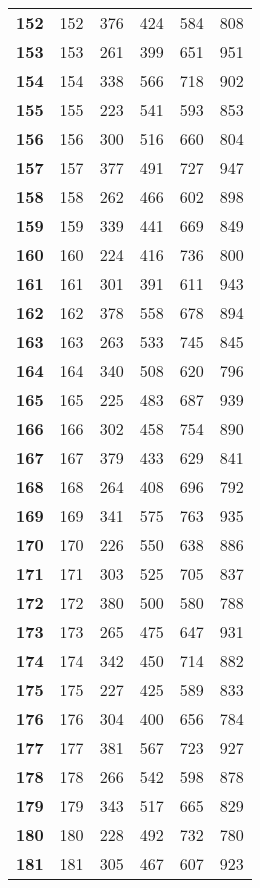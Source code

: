 \begin{longtable}{|l|c|c|c|c|c|}
  \textbf{152} & 152 &376 & 424 & 584 & 808 \\
  \textbf{153} & 153 &261 & 399 & 651 & 951 \\
  \textbf{154} & 154 &338 & 566 & 718 & 902 \\
  \textbf{155} & 155 &223 & 541 & 593 & 853 \\
  \textbf{156} & 156 &300 & 516 & 660 & 804 \\
  \textbf{157} & 157 &377 & 491 & 727 & 947 \\
  \textbf{158} & 158 &262 & 466 & 602 & 898 \\
  \textbf{159} & 159 &339 & 441 & 669 & 849 \\
  \textbf{160} & 160 &224 & 416 & 736 & 800 \\
  \textbf{161} & 161 &301 & 391 & 611 & 943 \\
  \textbf{162} & 162 &378 & 558 & 678 & 894 \\
  \textbf{163} & 163 &263 & 533 & 745 & 845 \\
  \textbf{164} & 164 &340 & 508 & 620 & 796 \\
  \textbf{165} & 165 &225 & 483 & 687 & 939 \\
  \textbf{166} & 166 &302 & 458 & 754 & 890 \\
  \textbf{167} & 167 &379 & 433 & 629 & 841 \\
  \textbf{168} & 168 &264 & 408 & 696 & 792 \\
  \textbf{169} & 169 &341 & 575 & 763 & 935 \\
  \textbf{170} & 170 &226 & 550 & 638 & 886 \\
  \textbf{171} & 171 &303 & 525 & 705 & 837 \\
  \textbf{172} & 172 &380 & 500 & 580 & 788 \\
  \textbf{173} & 173 &265 & 475 & 647 & 931 \\
  \textbf{174} & 174 &342 & 450 & 714 & 882 \\
  \textbf{175} & 175 &227 & 425 & 589 & 833 \\
  \textbf{176} & 176 &304 & 400 & 656 & 784 \\
  \textbf{177} & 177 &381 & 567 & 723 & 927 \\
  \textbf{178} & 178 &266 & 542 & 598 & 878 \\
  \textbf{179} & 179 &343 & 517 & 665 & 829 \\
  \textbf{180} & 180 &228 & 492 & 732 & 780 \\
  \textbf{181} & 181 &305 & 467 & 607 & 923 \\

\end{longtable}
